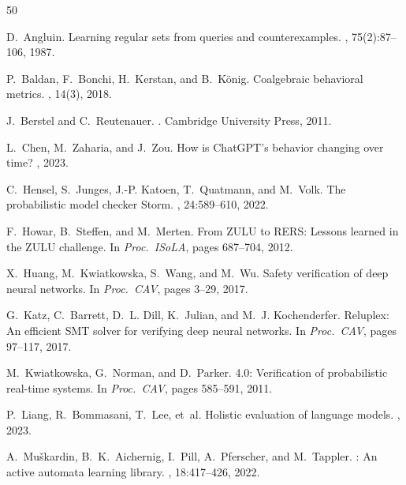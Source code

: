 \documentclass[11pt]{article}
\begin{document}
\begin{thebibliography}{50}

D.~Angluin.
\newblock Learning regular sets from queries and counterexamples.
, 75(2):87--106, 1987.


P.~Baldan, F.~Bonchi, H.~Kerstan, and B.~K{\"o}nig.
\newblock Coalgebraic behavioral metrics.
, 14(3), 2018.

J.~Berstel and C.~Reutenauer.
.
\newblock Cambridge University Press, 2011.


L.~Chen, M.~Zaharia, and J.~Zou.
\newblock How is {ChatGPT}'s behavior changing over time?
, 2023.


C.~Hensel, S.~Junges, J.-P. Katoen, T.~Quatmann, and M.~Volk.
\newblock The probabilistic model checker {Storm}.
, 24:589--610, 2022.

F.~Howar, B.~Steffen, and M.~Merten.
\newblock From {ZULU} to {RERS}: Lessons learned in the {ZULU} challenge.
\newblock In {\em Proc.\ ISoLA}, pages 687--704, 2012.

X.~Huang, M.~Kwiatkowska, S.~Wang, and M.~Wu.
\newblock Safety verification of deep neural networks.
\newblock In {\em Proc.\ CAV}, pages 3--29, 2017.

G.~Katz, C.~Barrett, D.~L. Dill, K.~Julian, and M.~J. Kochenderfer.
\newblock Reluplex: An efficient {SMT} solver for verifying deep
  neural networks.
\newblock In {\em Proc.\ CAV}, pages 97--117, 2017.

M.~Kwiatkowska, G.~Norman, and D.~Parker.
 4.0: Verification of probabilistic real-time systems.
\newblock In {\em Proc.\ CAV}, pages 585--591, 2011.

P.~Liang, R.~Bommasani, T.~Lee, et~al.
\newblock Holistic evaluation of language models.
, 2023.

A.~Mu{\v{s}}kardin, B.~K.~Aichernig, I.~Pill, A.~Pferscher, and
  M.~Tappler.
: An active automata learning library.
, 18:417--426, 2022.


\end{thebibliography}
\end{document}
